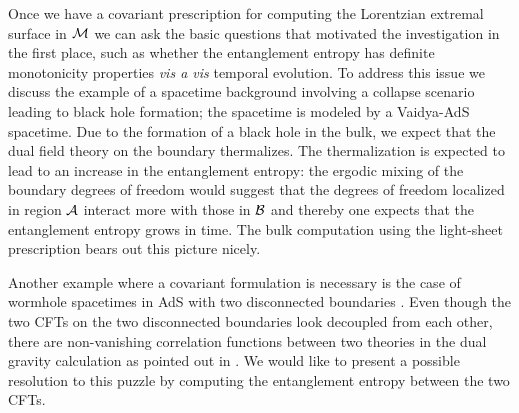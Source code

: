 \documentclass[12pt]{article}
\def\CA{{\cal A}}
\def\CB{{\cal B}}
\def\bulk{{\cal M}}
\def\rA{\CA}
\def\rB{\CB}
\begin{document}
Once we have a covariant prescription for computing the Lorentzian
extremal surface in $\bulk$ we can ask the basic questions that
motivated the investigation in the first place, such as whether the
entanglement entropy has definite monotonicity
 properties {\it vis a vis} temporal evolution. To address this issue we
  discuss the example of a spacetime background involving a collapse scenario
   leading to black hole formation; the spacetime is modeled by a Vaidya-AdS spacetime.
    Due to the formation of a black hole in the bulk, we expect that the dual field theory
    on the boundary thermalizes. The thermalization is expected to lead to an increase
     in the entanglement entropy: the ergodic mixing of the boundary degrees of freedom
      would suggest that the degrees of freedom localized in region $\rA$ interact more
       with those in $\rB$ and thereby one expects that the entanglement entropy grows
        in time. The  bulk computation using the light-sheet prescription bears out this picture nicely.

Another example where a covariant formulation is necessary is the
case of wormhole spacetimes in AdS with two disconnected boundaries
\cite{Maldacena:2004rf}.
 Even though the two CFTs on the two disconnected boundaries look
 decoupled from each other, there are non-vanishing correlation functions
  between two theories in the dual gravity calculation as pointed out in
   \cite{Maldacena:2004rf}. We would like to present a possible resolution
    to this puzzle  by computing the entanglement entropy between the two CFTs.
\end{document}
